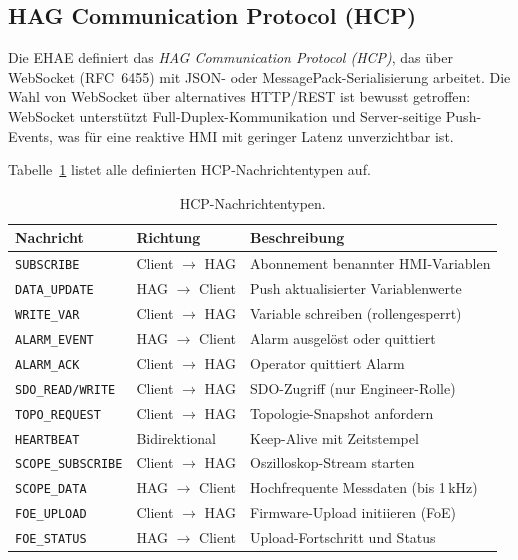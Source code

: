 ﻿\documentclass[12pt,a4paper]{article}
\begin{document}
\subsection{HAG Communication Protocol (HCP)}

Die EHAE definiert das \emph{HAG Communication Protocol (HCP)}, das über WebSocket
(RFC~6455) \cite{rfc6455} mit JSON- oder MessagePack-Serialisierung arbeitet. Die Wahl
von WebSocket über alternatives HTTP/REST ist bewusst getroffen: WebSocket unterstützt
Full-Duplex-Kommunikation und Server-seitige Push-Events, was für eine reaktive HMI mit
geringer Latenz unverzichtbar ist.

Tabelle~\ref{tab:hcp_messages} listet alle definierten HCP-Nachrichtentypen auf.

\begin{table}[H]
\centering
\caption{HCP-Nachrichtentypen.}
\label{tab:hcp_messages}
\begin{tabularx}{\textwidth}{llX}
\toprule
\textbf{Nachricht}          & \textbf{Richtung}     & \textbf{Beschreibung} \\
\midrule
\texttt{SUBSCRIBE}          & Client $\to$ HAG      & Abonnement benannter HMI-Variablen \\
\texttt{DATA\_UPDATE}       & HAG $\to$ Client      & Push aktualisierter Variablenwerte \\
\texttt{WRITE\_VAR}         & Client $\to$ HAG      & Variable schreiben (rollengesperrt) \\
\texttt{ALARM\_EVENT}       & HAG $\to$ Client      & Alarm ausgelöst oder quittiert \\
\texttt{ALARM\_ACK}         & Client $\to$ HAG      & Operator quittiert Alarm \\
\texttt{SDO\_READ/WRITE}    & Client $\to$ HAG      & SDO-Zugriff (nur Engineer-Rolle) \\
\texttt{TOPO\_REQUEST}      & Client $\to$ HAG      & Topologie-Snapshot anfordern \\
\texttt{HEARTBEAT}          & Bidirektional         & Keep-Alive mit Zeitstempel \\
\texttt{SCOPE\_SUBSCRIBE}   & Client $\to$ HAG      & Oszilloskop-Stream starten \\
\texttt{SCOPE\_DATA}        & HAG $\to$ Client      & Hochfrequente Messdaten (bis 1\,kHz) \\
\texttt{FOE\_UPLOAD}        & Client $\to$ HAG      & Firmware-Upload initiieren (FoE) \\
\texttt{FOE\_STATUS}        & HAG $\to$ Client      & Upload-Fortschritt und Status \\
\bottomrule
\end{tabularx}
\end{table}
\end{document}
